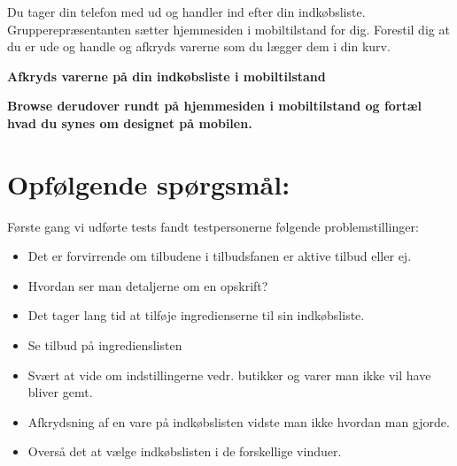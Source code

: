 Du tager din telefon med ud og handler ind efter din indkøbsliste. Grupperepræsentanten sætter hjemmesiden i mobiltilstand for dig. Forestil dig at du er ude og handle og afkryds varerne som du lægger dem i din kurv.

\textbf{Afkryds varerne på din indkøbsliste i mobiltilstand}

\textbf{Browse derudover rundt på hjemmesiden i mobiltilstand og fortæl hvad du synes om designet på mobilen.}


\section{Opfølgende spørgsmål:}

Første gang vi udførte tests fandt testpersonerne følgende problemstillinger:

\begin{itemize}
\item Det er forvirrende om tilbudene i tilbudsfanen er aktive tilbud eller ej.
\item Hvordan ser man detaljerne om en opskrift?
\item Det tager lang tid at tilføje ingredienserne til sin indkøbsliste.
\item Se tilbud på ingredienslisten 
\item Svært at vide om indstillingerne vedr. butikker og varer man ikke vil have bliver gemt.
\item Afkrydsning af en vare på indkøbslisten vidste man ikke hvordan man gjorde.
\item Overså det at vælge indkøbslisten i de forskellige vinduer.

\end{itemize}

